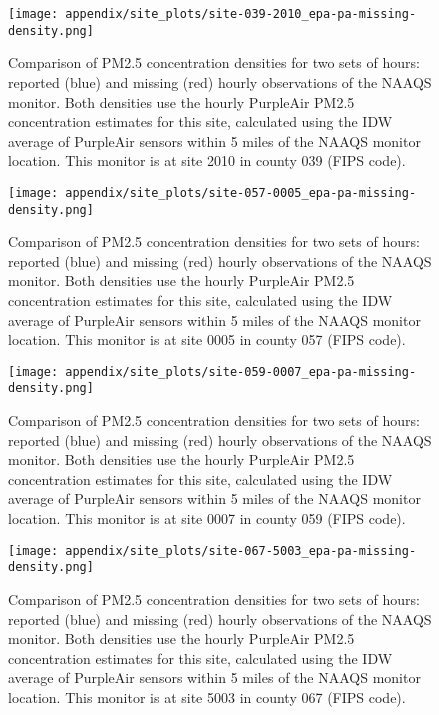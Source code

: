 \begin{figure}
\centering
\texttt{[image: appendix/site\_plots/site-039-2010\_epa-pa-missing-density.png]}
\caption{Comparison of PM2.5 concentration densities for two sets of hours: reported (blue) and missing (red) hourly observations of the NAAQS monitor. Both densities use the hourly PurpleAir PM2.5 concentration estimates for this site, calculated using the IDW average of PurpleAir sensors within 5 miles of the NAAQS monitor location. This monitor is at site 2010 in county 039 (FIPS code).}
\label{fig:missing-density_039-2010}
\end{figure}

\begin{figure}
\centering
\texttt{[image: appendix/site\_plots/site-057-0005\_epa-pa-missing-density.png]}
\caption{Comparison of PM2.5 concentration densities for two sets of hours: reported (blue) and missing (red) hourly observations of the NAAQS monitor. Both densities use the hourly PurpleAir PM2.5 concentration estimates for this site, calculated using the IDW average of PurpleAir sensors within 5 miles of the NAAQS monitor location. This monitor is at site 0005 in county 057 (FIPS code).}
\label{fig:missing-density_057-0005}
\end{figure}

\begin{figure}
\centering
\texttt{[image: appendix/site\_plots/site-059-0007\_epa-pa-missing-density.png]}
\caption{Comparison of PM2.5 concentration densities for two sets of hours: reported (blue) and missing (red) hourly observations of the NAAQS monitor. Both densities use the hourly PurpleAir PM2.5 concentration estimates for this site, calculated using the IDW average of PurpleAir sensors within 5 miles of the NAAQS monitor location. This monitor is at site 0007 in county 059 (FIPS code).}
\label{fig:missing-density_059-0007}
\end{figure}

\begin{figure}
\centering
\texttt{[image: appendix/site\_plots/site-067-5003\_epa-pa-missing-density.png]}
\caption{Comparison of PM2.5 concentration densities for two sets of hours: reported (blue) and missing (red) hourly observations of the NAAQS monitor. Both densities use the hourly PurpleAir PM2.5 concentration estimates for this site, calculated using the IDW average of PurpleAir sensors within 5 miles of the NAAQS monitor location. This monitor is at site 5003 in county 067 (FIPS code).}
\label{fig:missing-density_067-5003}
\end{figure}

